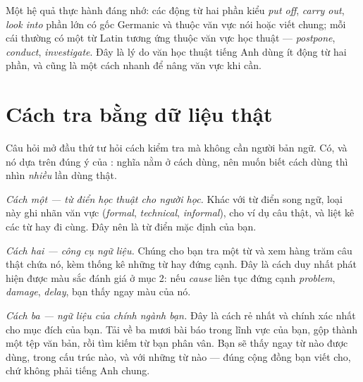 \documentclass[../../english.tex]{subfiles}
\begin{document}
Một hệ quả thực hành đáng nhớ: các động từ hai phần kiểu \emph{put off}, \emph{carry out}, \emph{look into} phần lớn có gốc Germanic và thuộc văn vực nói hoặc viết chung; mỗi cái thường có một từ Latin tương ứng thuộc văn vực học thuật --- \emph{postpone}, \emph{conduct}, \emph{investigate}. Đây là lý do văn học thuật tiếng Anh dùng ít động từ hai phần, và cũng là một cách nhanh để nâng văn vực khi cần.

\begin{gocre}
\end{gocre}

\section{Cách tra bằng dữ liệu thật}

Câu hỏi mở đầu thứ tư hỏi cách kiểm tra mà không cần người bản ngữ. Có, và nó dựa trên đúng ý của : nghĩa nằm ở cách dùng, nên muốn biết cách dùng thì nhìn \emph{nhiều} lần dùng thật.

\emph{Cách một --- từ điển học thuật cho người học}\cite{oald,ldoce}\emph{.} Khác với từ điển song ngữ, loại này ghi nhãn văn vực (\emph{formal}, \emph{technical}, \emph{informal}), cho ví dụ câu thật, và liệt kê các từ hay đi cùng. Đây nên là từ điển mặc định của bạn.

\emph{Cách hai --- công cụ ngữ liệu}\cite{coca}\emph{.} Chúng cho bạn tra một từ và xem hàng trăm câu thật chứa nó, kèm thống kê những từ hay đứng cạnh. Đây là cách duy nhất phát hiện được màu sắc đánh giá ở mục 2: nếu \emph{cause} liên tục đứng cạnh \emph{problem}, \emph{damage}, \emph{delay}, bạn thấy ngay màu của nó.

\emph{Cách ba --- ngữ liệu của chính ngành bạn.} Đây là cách rẻ nhất và chính xác nhất cho mục đích của bạn. Tải về ba mươi bài báo trong lĩnh vực của bạn, gộp thành một tệp văn bản, rồi tìm kiếm từ bạn phân vân. Bạn sẽ thấy ngay từ nào được dùng, trong cấu trúc nào, và với những từ nào --- đúng cộng đồng bạn viết cho, chứ không phải tiếng Anh chung.
\end{document}
